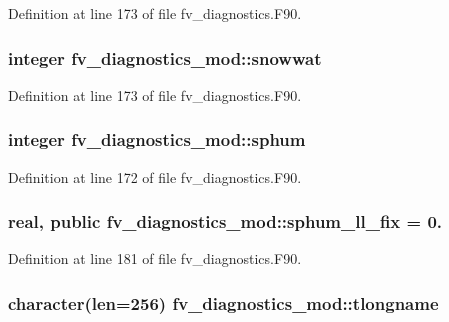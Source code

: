 Definition at line 173 of file fv\-\_\-diagnostics.\-F90.

\subsubsection[{snowwat}]{\setlength{\rightskip}{0pt plus 5cm}integer fv\-\_\-diagnostics\-\_\-mod\-::snowwat\hspace{0.3cm}{\ttfamily [private]}}\label{classfv__diagnostics__mod_ab584717500f6b11a4e8e05004fa67eb2}


Definition at line 173 of file fv\-\_\-diagnostics.\-F90.

\subsubsection[{sphum}]{\setlength{\rightskip}{0pt plus 5cm}integer fv\-\_\-diagnostics\-\_\-mod\-::sphum\hspace{0.3cm}{\ttfamily [private]}}\label{classfv__diagnostics__mod_a60dad9285aa4277546ef49434b1d9362}


Definition at line 172 of file fv\-\_\-diagnostics.\-F90.

\subsubsection[{sphum\-\_\-ll\-\_\-fix}]{\setlength{\rightskip}{0pt plus 5cm}real, public fv\-\_\-diagnostics\-\_\-mod\-::sphum\-\_\-ll\-\_\-fix = 0.}\label{classfv__diagnostics__mod_a3ef2fb09ea5556e51585d53e17aeb2ac}


Definition at line 181 of file fv\-\_\-diagnostics.\-F90.

\subsubsection[{tlongname}]{\setlength{\rightskip}{0pt plus 5cm}character(len=256) fv\-\_\-diagnostics\-\_\-mod\-::tlongname\hspace{0.3cm}{\ttfamily [private]}}\label{classfv__diagnostics__mod_a597d0a2e5b049db0b3e26531a532c2ac}


